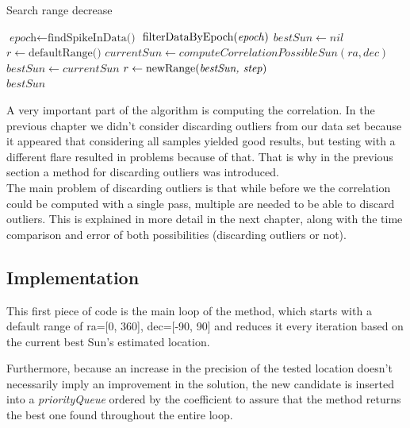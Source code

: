 \begin{algorithm}
	\caption{Search range decrease}\label{searchRangeDecrease}
	\begin{algorithmic}[1]
		\State $\textit{epoch} \gets \text{findSpikeInData()}$ 
		\State $\text{filterDataByEpoch(\textit{epoch})}$
		\State $bestSun \gets nil$
		\State $r \gets \text{defaultRange()}$ 
		\State $currentSun \gets computeCorrelationPossibleSun(ra, dec)$
		\State $bestSun \gets currentSun$
		\State $r \gets \text{newRange(\textit{bestSun, step})}$ 
		\EndIf
		\EndFor
		\EndFor
		\EndFor
		\\
		\Return $bestSun$
		\EndProcedure
	\end{algorithmic}
\end{algorithm}

A very important part of the algorithm is computing the correlation. In the previous chapter we didn't consider discarding outliers from our data set because it appeared that considering all samples yielded good results, but testing with a different flare resulted in problems because of that. That is why in the previous section a method for discarding outliers was introduced. \\

The main problem of discarding outliers is that while before we the correlation could be computed with a single pass, multiple are needed to be able to discard outliers.
This is explained in more detail in the next chapter, along with the time comparison and error of both possibilities (discarding outliers or not).

\subsection{Implementation}

This first piece of code is the main loop of the method, which starts with a default range of ra=[0, 360], dec=[-90, 90] and reduces it every iteration based on the current best Sun's estimated location. 

Furthermore, because an increase in the precision of the tested location doesn't necessarily imply an improvement in the solution, the new candidate is inserted into a \textit{priorityQueue} ordered by the coefficient to assure that the method returns the best one found throughout the entire loop. 

